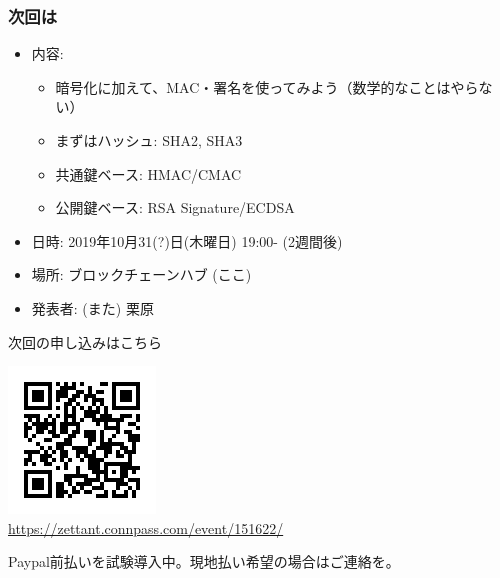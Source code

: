 \documentclass[12pt,dvipdfmx]{beamer}
\begin{document}
\begin{frame}
\frametitle{次回は}
\begin{itemize}
 \item 内容: 
\begin{itemize}
 \item 暗号化に加えて、MAC・署名を使ってみよう（数学的なことはやらない）
 \item まずはハッシュ: SHA2, SHA3
 \item 共通鍵ベース: HMAC/CMAC
 \item 公開鍵ベース: RSA Signature/ECDSA
\end{itemize}
 \item 日時: 2019年10月31(?)日(木曜日) 19:00- (2週間後)
 \item 場所: ブロックチェーンハブ (ここ)
 \item 発表者: (また) 栗原
\end{itemize}
\end{frame}

\begin{frame}
次回の申し込みはこちら

\begin{center}
 \includegraphics[width=0.6\linewidth]{FigsSample03/QR_Code1571235785.png}\\[-2ex]
\url{https://zettant.connpass.com/event/151622/}
\end{center}

\alert{Paypal前払いを試験導入中}。現地払い希望の場合はご連絡を。
\end{frame}





\end{document}
